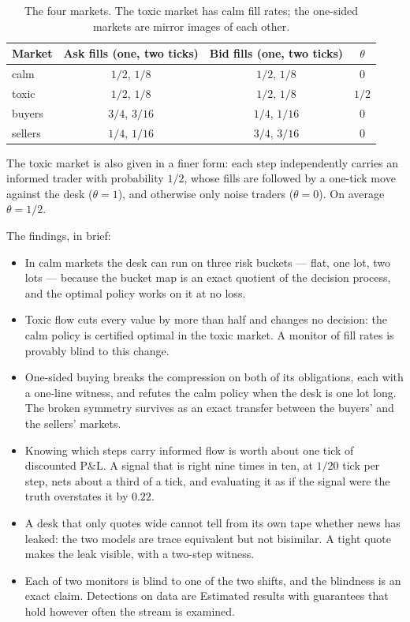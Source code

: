 \documentclass[11pt]{article}
\theoremstyle{definition}
\theoremstyle{plain}
\begin{document}
\begin{table}[ht]
\centering\small
\begin{tabular}{lccc}
\toprule
Market & Ask fills (one, two ticks) & Bid fills (one, two ticks) & $\theta$\\
\midrule
calm & $1/2$, $1/8$ & $1/2$, $1/8$ & $0$\\
toxic & $1/2$, $1/8$ & $1/2$, $1/8$ & $1/2$\\
buyers & $3/4$, $3/16$ & $1/4$, $1/16$ & $0$\\
sellers & $1/4$, $1/16$ & $3/4$, $3/16$ & $0$\\
\bottomrule
\end{tabular}
\caption{The four markets. The toxic market has calm fill rates; the one-sided markets are
mirror images of each other.}\label{tab:ex4markets}
\end{table}

The toxic market is also given in a finer form: each step independently carries an informed trader
with probability $1/2$, whose fills are followed by a one-tick move against the desk ($\theta=1$), and
otherwise only noise traders ($\theta=0$). On average $\theta=1/2$.

The findings, in brief:
\begin{itemize}
\item In calm markets the desk can run on three risk buckets --- flat, one lot, two lots ---
because the bucket map is an exact quotient of the decision process, and the optimal policy works on
it at no loss.
\item Toxic flow cuts every value by more than half and changes no decision: the calm policy is
certified optimal in the toxic market. A monitor of fill rates is provably blind to this change.
\item One-sided buying breaks the compression on both of its obligations, each with a one-line
witness, and refutes the calm policy when the desk is one lot long. The broken symmetry survives as
an exact transfer between the buyers' and the sellers' markets.
\item Knowing which steps carry informed flow is worth about one tick of discounted P\&L. A signal that
is right nine times in ten, at $1/20$ tick per step, nets about a third of a tick, and evaluating it
as if the signal were the truth overstates it by $0.22$.
\item A desk that only quotes wide cannot tell from its own tape whether news has leaked: the two
models are trace equivalent but not bisimilar. A tight quote makes the leak visible, with a
two-step witness.
\item Each of two monitors is blind to one of the two shifts, and the blindness is an exact claim.
Detections on data are Estimated results with guarantees that hold however often the stream is
examined.
\end{itemize}
\end{document}
